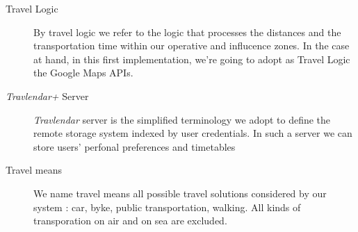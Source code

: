 \begin{description}
		\item[Travel Logic] By travel logic we refer to the logic that processes the distances and the transportation time within our operative and influcence zones. In the case at hand, in this first implementation, we're going to adopt as Travel Logic the Google Maps APIs.
				
		\item [\textit{Travlendar+} Server] \textit{Travlendar} server is the simplified terminology we adopt to define the remote storage system indexed by user credentials. In such a server we can store users' perfonal preferences and timetables  
				
		\item [Travel means] We name travel means all possible travel solutions considered by our system : car, byke, public transportation, walking. All kinds of transporation on air and on sea are excluded.
				
\end{description}
